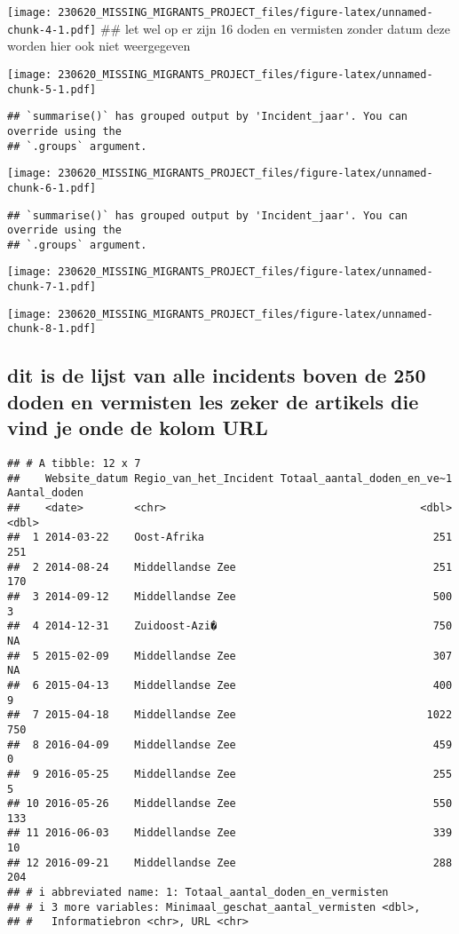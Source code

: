 \documentclass[
]{article}
\begin{document}
\texttt{[image: 230620\_MISSING\_MIGRANTS\_PROJECT\_files/figure-latex/unnamed-chunk-4-1.pdf]}
\#\# let wel op er zijn 16 doden en vermisten zonder datum deze worden
hier ook niet weergegeven

\texttt{[image: 230620\_MISSING\_MIGRANTS\_PROJECT\_files/figure-latex/unnamed-chunk-5-1.pdf]}

\begin{verbatim}
## `summarise()` has grouped output by 'Incident_jaar'. You can override using the
## `.groups` argument.
\end{verbatim}

\texttt{[image: 230620\_MISSING\_MIGRANTS\_PROJECT\_files/figure-latex/unnamed-chunk-6-1.pdf]}

\begin{verbatim}
## `summarise()` has grouped output by 'Incident_jaar'. You can override using the
## `.groups` argument.
\end{verbatim}

\texttt{[image: 230620\_MISSING\_MIGRANTS\_PROJECT\_files/figure-latex/unnamed-chunk-7-1.pdf]}

\texttt{[image: 230620\_MISSING\_MIGRANTS\_PROJECT\_files/figure-latex/unnamed-chunk-8-1.pdf]}

\hypertarget{dit-is-de-lijst-van-alle-incidents-boven-de-250-doden-en-vermisten-les-zeker-de-artikels-die-vind-je-onde-de-kolom-url}{%
\subsection{dit is de lijst van alle incidents boven de 250 doden en
vermisten les zeker de artikels die vind je onde de kolom
URL}\label{dit-is-de-lijst-van-alle-incidents-boven-de-250-doden-en-vermisten-les-zeker-de-artikels-die-vind-je-onde-de-kolom-url}}

\begin{verbatim}
## # A tibble: 12 x 7
##    Website_datum Regio_van_het_Incident Totaal_aantal_doden_en_ve~1 Aantal_doden
##    <date>        <chr>                                        <dbl>        <dbl>
##  1 2014-03-22    Oost-Afrika                                    251          251
##  2 2014-08-24    Middellandse Zee                               251          170
##  3 2014-09-12    Middellandse Zee                               500            3
##  4 2014-12-31    Zuidoost-Azi�                                  750           NA
##  5 2015-02-09    Middellandse Zee                               307           NA
##  6 2015-04-13    Middellandse Zee                               400            9
##  7 2015-04-18    Middellandse Zee                              1022          750
##  8 2016-04-09    Middellandse Zee                               459            0
##  9 2016-05-25    Middellandse Zee                               255            5
## 10 2016-05-26    Middellandse Zee                               550          133
## 11 2016-06-03    Middellandse Zee                               339           10
## 12 2016-09-21    Middellandse Zee                               288          204
## # i abbreviated name: 1: Totaal_aantal_doden_en_vermisten
## # i 3 more variables: Minimaal_geschat_aantal_vermisten <dbl>,
## #   Informatiebron <chr>, URL <chr>
\end{verbatim}
\end{document}
